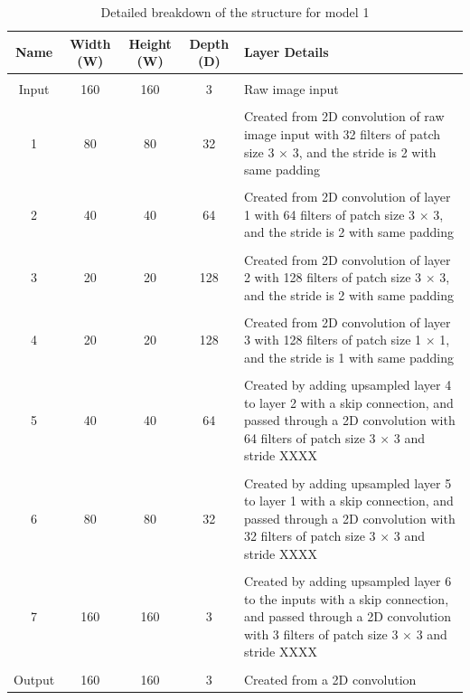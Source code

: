 \documentclass[a4paper]{article}
\begin{document}
\begin{table}[h]
\centering
\caption{Detailed breakdown of the structure for model 1}\scriptsize
\begin{tabular}{ccccp{8cm}}
\toprule
\textbf{Name} & \textbf{Width (W)} & \textbf{Height (W)} & \textbf{Depth (D)} & Layer Details\\  
\midrule
 & & & &\\
Input & 160 & 160 & 3 & Raw image input\\
 & & & &\\
1 & 80 & 80 & 32 & Created from 2D convolution of raw image input with 32 filters of patch size 3 $\times $ 3, and the stride is 2 with same padding\\
 & & & &\\
2 & 40 & 40 & 64 & Created from 2D convolution of layer 1 with 64 filters of patch size 3 $\times $ 3, and the stride is 2 with same padding\\
 & & & &\\
3 & 20 & 20 & 128 & Created from 2D convolution of layer 2 with 128 filters of patch size 3 $\times$ 3, and the stride is 2 with same padding\\
 & & & &\\
4 & 20 & 20 & 128 & Created from 2D convolution of layer 3 with 128 filters of patch size 1 $\times$ 1, and the stride is 1 with same padding\\
 & & & &\\
5 & 40 & 40 & 64 & Created by adding upsampled layer 4 to layer 2 with a skip connection, and passed through a 2D convolution with 64 filters of patch size 3 $\times$ 3 and stride XXXX\\
 & & & &\\
6 & 80 & 80 & 32 & Created by adding upsampled layer 5 to layer 1 with a skip connection, and passed through a 2D convolution with 32 filters of patch size 3 $\times$ 3 and stride XXXX\\
 & & & &\\
7 & 160 & 160 & 3 & Created by adding upsampled layer 6 to the inputs with a skip connection, and passed through a 2D convolution with 3 filters of patch size 3 $\times$ 3 and stride XXXX\\
& & & &\\
Output & 160 & 160 & 3 & Created from a 2D convolution\\
\bottomrule
\end{tabular}
\end{table}

\newpage
\end{document}
